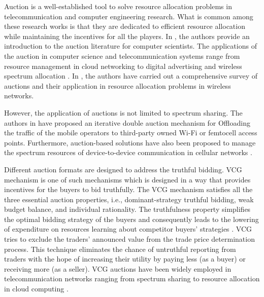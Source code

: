 Auction is a well-established tool to solve resource allocation problems in telecommunication and computer engineering research. What is common among these research works is that they are dedicated to efficient resource allocation while maintaining the incentives for all the players. In \cite{Parsons:2011:ABG:1883612.1883617}, the authors provide an introduction to the auction literature for computer scientists. The applications of the auction in computer science and telecommunication systems range from resource management in cloud networking \cite{7807328} to digital advertising \cite{7390161} and wireless spectrum allocation \cite{6365159}.
In \cite{6365159}, the authors have carried out a comprehensive survey of auctions and their application in resource allocation problems in wireless networks.


However, the application of auctions is not limited to spectrum sharing. The authors in \cite{6894640} have proposed an iterative double auction mechanism for Offloading the traffic of the mobile operators to third-party owned Wi-Fi or femtocell access points. Furthermore, auction-based solutions have also been proposed to manage the spectrum resources of device-to-device communication in cellular networks \cite{7286856}.

Different auction formats are designed to address the truthful bidding.  \ac{VCG} mechanism \cite{Vickrey} is one of such mechanisms which is designed in a way that provides incentives for the buyers to bid truthfully. The \ac{VCG} mechanism satisfies all the three essential auction properties, i.e., dominant-strategy truthful bidding, weak budget balance, and individual rationality. The truthfulness property simplifies the optimal bidding strategy of the buyers and consequently leads to the lowering of expenditure on resources learning about competitor buyers' strategies \cite{Ausubel06thelovely}.
\ac{VCG} tries to exclude the traders' announced value from the trade price determination process. This technique eliminates the chance of untruthful reporting from traders with the hope of increasing their utility by paying less (as a buyer) or receiving more (as a seller).
\ac{VCG} auctions have been widely employed in telecommunication networks ranging from spectrum sharing \cite{7842378} to resource allocation in cloud computing \cite{7933203}. 

